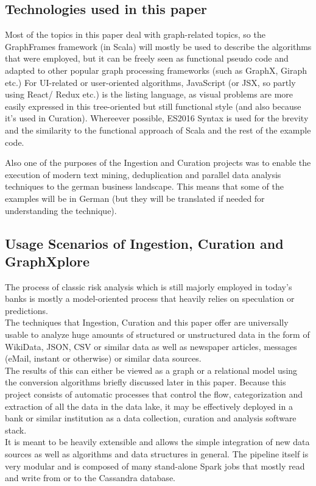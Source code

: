 \documentclass[
        a4paper,     %
        titlepage,   %
        oneside,     %
        parskip      %
        ]{scrartcl}  %
\begin{document}
    \subsection{Technologies used in this paper}
    Most of the topics in this paper deal with graph-related topics, so the GraphFrames framework
    (in Scala) will mostly be used to describe the algorithms that were employed,
    but it can be freely seen as functional pseudo code and adapted to other popular
    graph processing frameworks (such as GraphX, Giraph etc.) %
    For UI-related or user-oriented algorithms, JavaScript (or JSX, so partly using React/ Redux etc.)
    is the listing language, as visual problems are more easily expressed in this
    tree-oriented but still functional style (and also because it's used in Curation). %
    Whereever possible, ES2016 Syntax is used for the brevity and the similarity
    to the functional approach of Scala and the rest of the example code.

    Also one of the purposes of the Ingestion and Curation projects was to enable
    the execution of modern text mining, deduplication and parallel data analysis techniques
    to the german business landscape. This means that some of the examples will be
    in German (but they will be translated if needed for understanding the technique).

    \subsection{Usage Scenarios of Ingestion, Curation and GraphXplore}
    The process of classic risk analysis which is still majorly employed in today's banks is mostly
    a model-oriented process that heavily relies on speculation or predictions.\\
    The techniques that Ingestion, Curation and this paper offer are universally
    usable to analyze huge amounts of structured or unstructured data
    in the form of WikiData, JSON, CSV or similar data as well as newspaper articles,
    messages (eMail, instant or otherwise) or similar data sources.\\
    The results of this can either be viewed as a graph or a relational model
    using the conversion algorithms briefly discussed later in this paper.
    Because this project consists of automatic processes
    that control the flow, categorization and extraction
    of all the data in the data lake, it may be effectively deployed in a bank
    or similar institution as a data collection, curation and analysis software stack.\\
    It is meant to be heavily extensible and allows the simple integration of new data sources %
    as well as algorithms and data structures in general. The pipeline itself is very modular
    and is composed of many stand-alone Spark jobs that mostly read and write from or to the Cassandra database.
    \pagebreak
\end{document}
